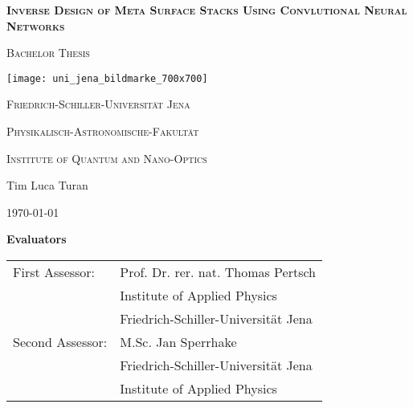 \begin{titlepage}
	\centering

	{\scshape\Large \textbf{Inverse Design of Meta Surface Stacks Using Convlutional Neural Networks} \par}
	\vspace{1cm}
	{\scshape\Large Bachelor Thesis \par}
	\vspace{1.5cm}
	\texttt{[image: uni\_jena\_bildmarke\_700x700]}\par
	{\huge\bfseries \par}
	\vspace{10cm}
	{\scshape\large Friedrich-Schiller-Universität Jena\par}
	{\scshape\large Physikalisch-Astronomische-Fakultät\par}
	{\scshape\large Institute of Quantum and Nano-Optics\par}
	\vfill
	{\Large Tim Luca Turan}

	\vfill

	{\large \today\par}
\end{titlepage}

\thispagestyle{empty}
\vspace*{\fill}
\textbf{\Large Evaluators}\\[1cm]

\begin{tabular}{ll}
First Assessor: & Prof. Dr. rer. nat. Thomas Pertsch\\
 & Institute of Applied Physics \\
 & Friedrich-Schiller-Universität Jena \\
Second Assessor: & M.Sc. Jan Sperrhake \\
 & Friedrich-Schiller-Universität Jena \\
 & Institute of Applied Physics \\
\end{tabular}
